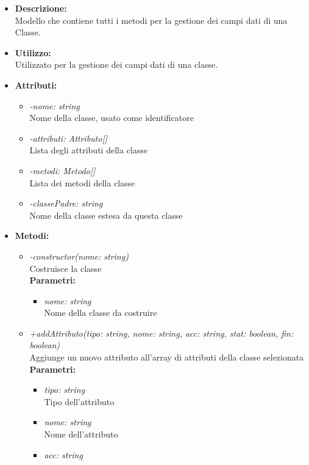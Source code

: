 \begin{itemize}
	\item \textbf{Descrizione:}\\
	Modello che contiene tutti i metodi per la gestione dei campi dati di una Classe.
	\item \textbf{Utilizzo:}\\
	Utilizzato per  la gestione dei campi dati di una classe.
	\item \textbf{Attributi:}
		\begin{itemize}
			\item \emph{-nome: string}\\
			Nome della classe, usato come identificatore
			\item \emph{-attributi: Attributo[]}\\
			Lista degli attributi della classe
			\item \emph{-metodi: Metodo[]}\\
			Lista dei metodi della classe
			\item \emph{-classePadre: string}\\
			Nome della classe estesa da questa classe
		\end{itemize}
	\item \textbf{Metodi:}
		\begin{itemize}
			\item \emph{-constructor(nome: string)}\\
    		Costruisce la classe\\
    		\textbf{Parametri:}
    		\begin{itemize}
    			\item \emph{nome: string}\\
    			Nome della classe da costruire
    		\end{itemize}
    		\item \emph{+addAttributo(tipo: string, nome: string, acc: string, stat: boolean, fin: boolean)}\\
    		Aggiunge un nuovo attributo all'array di attributi della classe selezionata\\
    		\textbf{Parametri:}
    		\begin{itemize}
    			\item \emph{tipo: string}\\
    			Tipo dell'attributo
    			\item \emph{nome: string}\\
    			Nome dell'attributo
    			\item \emph{acc: string}\\

\end{itemize}
\end{itemize}
\end{itemize}
